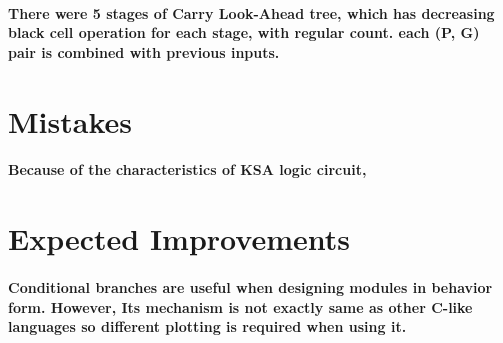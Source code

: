\documentclass[a4paper]{report}
\begin{document}
            \paragraph{\normalfont There were 5 stages of Carry Look-Ahead tree, which has decreasing black cell operation for each stage, with regular count. each (P, G) pair is combined with previous inputs.}

        \section{Mistakes}
            \paragraph{\normalfont Because of the characteristics of KSA logic circuit, }

        \section{Expected Improvements}
            \paragraph{\normalfont Conditional branches are useful when designing modules in behavior form. However, Its mechanism is not exactly same as other C-like languages so different plotting is required when using it.}
\end{document}
